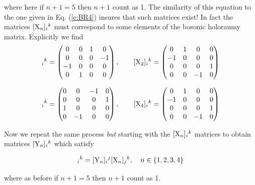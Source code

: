 \documentclass[12pt]{article}
\let\bm\relax
\newcommand{\bm}[1]{{\boldsymbol{#1}}}
\begin{document}
where here if $n+1=5$ then $n+1$ count as 1.
The similarity of this
equation to the one given in Eq. (\ref{e:BR4}) insures that such matrices exist!  In fact the matrices $[{\bm{\rm X}}_n]_{i}{}^{k}$ must 
correspond to some elements of the bosonic holoraumy matrix.  Explicitly we
find
\begin{equation}
[{\bm{\rm X}}_1]_{i}{}^{k}=
\begin{pmatrix}
0 & 0 & 1 & 0 \\
0 & 0 & 0 & -1 \\
-1 & 0 & 0 & 0 \\
0 & 1 & 0 & 0 \\
\end{pmatrix}
,\quad\quad
[{\bm{\rm X}}_2]_{i}{}^{k}=
\begin{pmatrix}
0 & 1 & 0 & 0 \\
-1 & 0 & 0 & 0 \\
0 & 0 & 0 & 1 \\
0 & 0 & -1 & 0 \\
\end{pmatrix}
\end{equation}

\begin{equation}
[{\bm{\rm X}}_3]_{i}{}^{k}=
\begin{pmatrix}
0 & 0 & -1 & 0 \\
0 & 0 & 0 & 1 \\
1 & 0 & 0 & 0 \\
0 & -1 & 0 & 0 \\
\end{pmatrix}
,\quad\quad
[{\bm{\rm X}}_4]_{i}{}^{k}=
\begin{pmatrix}
0 & 1 & 0 & 0 \\
-1 & 0 & 0 & 0 \\
0 & 0 & 0 & 1 \\
0 & 0 & -1 & 0 \\
\end{pmatrix}
\end{equation}

Now we repeat the same process {\it {but}} starting with the $[{\bm{\rm X}}_n]_{i}{}^{k}$ matrices to obtain matrices $[{\bm{\rm Y}}_n]_{i}{}^{k}$ which satisfy

\begin{equation}
[{\bm{\rm X}}_{n+1}]_{i}{}^{k}=[{\bm{\rm Y}}_n]_{i}{}^{j}[{\bm{\rm X}}_n]_{j}{}^{k},\quad n\in\{1,2,3,4\}
\label{eq6}
\end{equation}

where as before if $n+1=5$ then $n+1$ count as 1.  %
\end{document}

